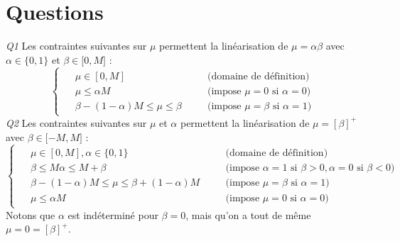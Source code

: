\documentclass[a4paper,12pt]{article}
\begin{document}
\section{Questions}
    \textit{Q1 }
    Les contraintes suivantes sur $\mu$ permettent la linéarisation de $\mu = \alpha \beta$ avec $\alpha \in \lbrace 0,1 \rbrace$ et $\beta \in \lbrack 0, M \rbrack$ : 
    \begin{equation*}
        \begin{cases}
            \begin{alignedat}{2}
                &\mu \in [0,M] && \quad \text{(domaine de définition)}  \\ 
                &\mu \leq \alpha M && \quad  \text{(impose } \mu = 0 \text{ si }  \alpha = 0 \text{)}\\
                &\beta - (1 - \alpha)M \leq \mu \leq \beta && \quad \text{(impose } \mu = \beta \text{ si }  \alpha = 1 \text{)}
            \end{alignedat}
        \end{cases}
    \end{equation*}
    \textit{Q2 }
    Les contraintes suivantes sur $\mu$ et $\alpha$ permettent la linéarisation de $\mu = [\beta]^{+}$ avec $\beta \in \lbrack -M, M \rbrack$ : 
    \begin{equation*}
        \begin{cases}
            \begin{alignedat}{2}
                &\mu \in [0,M], \alpha \in \lbrace 0,1 \rbrace && \quad \text{(domaine de définition)} \\ 
                &\beta \leq M \alpha \leq M + \beta && \quad \text{(impose } \alpha = 1 \text{ si }  \beta > 0, \alpha = 0 \text{ si } \beta < 0 \text{)} \\
                &\beta - (1-\alpha)M \leq \mu \leq \beta + (1-\alpha)M && \quad \text{(impose } \mu = \beta \text{ si }  \alpha = 1 \text{)} \\
                &\mu \leq \alpha M && \quad \text{(impose } \mu = 0 \text{ si }  \alpha = 0 \text{)}
            \end{alignedat}
        \end{cases}
    \end{equation*}
    Notons que $\alpha$ est indéterminé pour $\beta = 0$, mais qu'on a tout de même $\mu = 0= [\beta]^{+}$.
\end{document}
